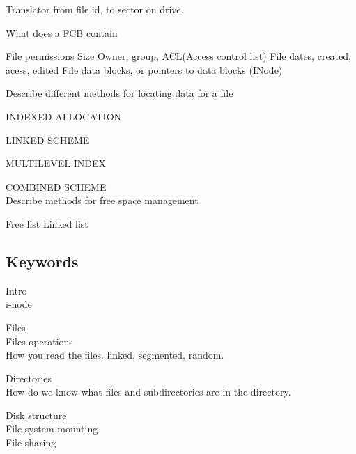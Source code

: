 \documentclass[a4paper,10pt,titlepage]{report}
\begin{document}
	Translator from file id, to sector on drive.

What does a FCB contain
	
	File permissions
	Size
	Owner, group, ACL(Access control list)
	File dates, created, acess, edited
	File data blocks, or pointers to data blocks (INode)

Describe different methods for locating data for a file
	
	INDEXED ALLOCATION

	LINKED SCHEME
	
	MULTILEVEL INDEX
	
	COMBINED SCHEME\\
	

Describe methods for free space management

	Free list
		Linked list
		

	




\subsection{Keywords}
Intro\\
	i-node\\
	
	
\vspace{5mm}
	
	
Files\\
\hspace{10mm}	Files operations\\
\hspace{10mm}	How you read the files. linked, segmented, random.\\
	
	
\vspace{5mm}
	
	
Directories\\
\hspace{10mm}	How do we know what files and subdirectories are in the directory.\\
	
	
	
\vspace{5mm}
	
Disk structure\\


\vspace{5mm}
File system mounting \\


\vspace{5mm}
File sharing \\
\end{document}
